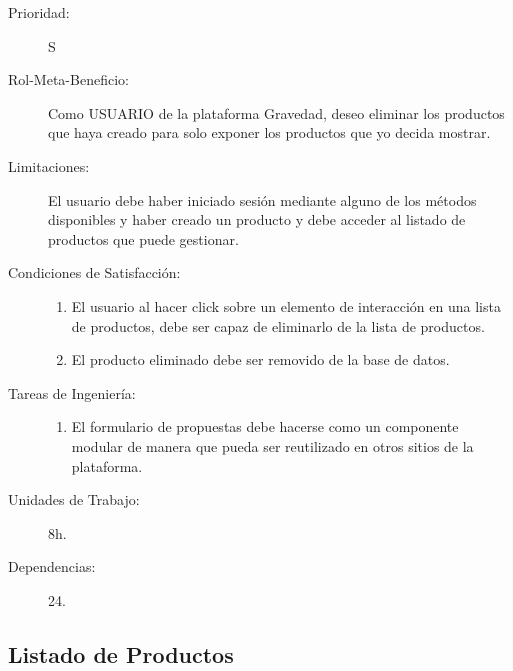 \begin{description}
    \item[Prioridad:] S
    \item[Rol-Meta-Beneficio:] Como USUARIO de la plataforma Gravedad, deseo eliminar los productos que haya creado para solo exponer los productos que yo decida mostrar.
    \item[Limitaciones:] El usuario debe haber iniciado sesión mediante alguno de los métodos disponibles y haber creado un producto y debe acceder al listado de productos que puede gestionar.
    \item[Condiciones de Satisfacción:]  \hfill
        \begin{enumerate}
            \item 	El usuario al hacer click sobre un elemento de interacción en una lista de productos, debe ser capaz de eliminarlo de la lista de productos.
    		\item El producto eliminado debe ser removido de la base de datos.
        \end{enumerate}
    \item[Tareas de Ingeniería:]  \hfill
        \begin{enumerate}
            \item El formulario de propuestas debe hacerse como un componente modular de manera que pueda ser reutilizado en otros sitios de la plataforma.
        \end{enumerate}
    \item[Unidades de Trabajo:] 8h.
    \item[Dependencias:] 24.
\end{description}

\newpage


\subsection{Listado de Productos}

